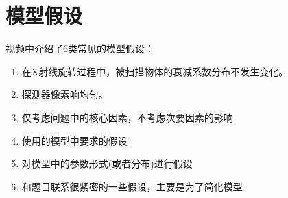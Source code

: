 \section{模型假设}
视频中介绍了6类常见的模型假设：
\begin{enumerate}
    \item 在X射线旋转过程中，被扫描物体的衰减系数分布不发生变化。
    \item 探测器像素响均匀。
    \item 仅考虑问题中的核心因素，不考虑次要因素的影响
    \item 使用的模型中要求的假设
    \item 对模型中的参数形式(或者分布)进行假设
    \item 和题目联系很紧密的一些假设，主要是为了简化模型
\end{enumerate}
